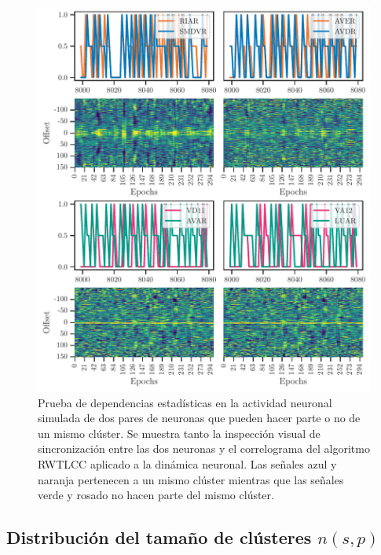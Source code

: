 \begin{figure}[h!]
	\centering\includegraphics[width=\imsize]{correlaciones_modelo.pdf}
	\caption[Prueba de dependencias estadísticas en la actividad neuronal simulada de dos pares de neuronas que pueden hacer parte o no de un mismo clúster.]{Prueba de dependencias estadísticas en la actividad  neuronal simulada de dos pares de neuronas que pueden hacer parte o no de un mismo clúster.   Se muestra tanto la   inspección visual de sincronización entre las dos neuronas y el  correlograma del algoritmo  RWTLCC aplicado a la  dinámica neuronal.  Las señales azul y naranja pertenecen a un mismo clúster mientras que las señales verde y rosado no hacen parte del mismo clúster.  } \label{fig:correlaciones_clusteres_modelo}
\end{figure}





\subsection{Distribución del tamaño de clústeres $n(s,p)$}\label{sec:distribucion_tamaño_modelo}

